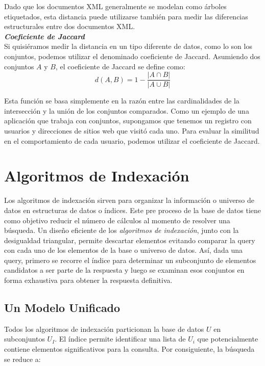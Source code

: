 Dado que los documentos XML generalmente se modelan como \'arboles etiquetados, esta distancia 
puede utilizarse tambi\'en para medir las diferencias estructurales entre dos documentos XML.\\

\noindent \textbf{\textit{Coeficiente de Jaccard}}\\

Si quisi\'eramos medir la distancia en un tipo diferente de datos, como lo son los conjuntos, 
podemos utilizar el denominado coeficiente de Jaccard. Asumiendo dos conjuntos $A$ y $B$, el 
coeficiente de Jaccard se define como:
\[
d(A,B) = 1 - \frac{|A \cap B|}{|A\cup B|}
\]

Esta funci\'on se basa simplemente en la raz\'on entre las cardinalidades de la intersecci\'on y 
la uni\'on de los conjuntos comparados. Como un ejemplo de una aplicaci\'on que trabaja con 
conjuntos, supongamos que tenemos un registro con usuarios y direcciones de sitios web que 
visit\'o cada uno. Para evaluar la similitud en el comportamiento de cada usuario, podemos 
utilizar el coeficiente de Jaccard.\\


\section{Algoritmos de Indexaci\'on}

Los algoritmos de indexaci\'on sirven para organizar la informaci\'on o universo de datos en
 estructuras de datos o \'indices. Este pre proceso de la base de datos tiene como objetivo
  reducir el n\'umero de c\'alculos al momento de resolver una b\'usqueda. Un dise\~no eficiente 
  de los \textit{algoritmos de indexaci\'on}, junto con la desigualdad triangular, permite 
  descartar   elementos evitando comparar la query con cada uno de los elementos de la base o 
  universo de datos. As\'i, dada una query, primero se recorre el \'indice para determinar un 
  subconjunto de elementos candidatos a ser parte de la respuesta y luego se examinan esos 
  conjuntos en forma exhaustiva para obtener la respuesta definitiva.\\

\subsection{Un Modelo Unificado}

Todos los algoritmos de indexaci\'on particionan la base de datos $U$ en subconjuntos $U_I$. El \'indice permite identificar una lista de $U_i$ que potencialmente contiene elementos significativos para la consulta. Por consiguiente, la b\'usqueda se reduce a:

